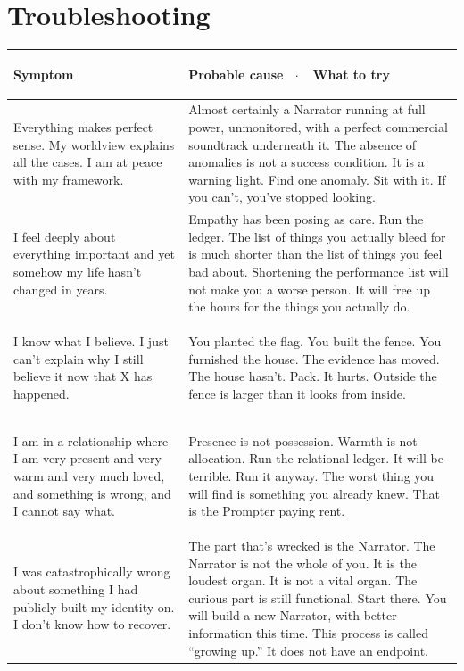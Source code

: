 \documentclass[11pt, letterpaper]{article}
\begin{document}
\section{Troubleshooting}

\begin{center}
\small
\begin{tabularx}{\textwidth}{@{} >{\bfseries\raggedright\arraybackslash}p{5cm} X @{}}
\toprule
\textbf{Symptom} & \textbf{Probable cause \ $\cdot$\ \ What to try} \\
\midrule
Everything makes perfect sense. My worldview explains all the cases. I am at peace with my framework. &
Almost certainly a Narrator running at full power, unmonitored, with a perfect commercial soundtrack underneath it. The absence of anomalies is not a success condition. It is a warning light. Find one anomaly. Sit with it. If you can't, you've stopped looking. \\[8pt]

I feel deeply about everything important and yet somehow my life hasn't changed in years. &
Empathy has been posing as care. Run the ledger. The list of things you actually bleed for is much shorter than the list of things you feel bad about. Shortening the performance list will not make you a worse person. It will free up the hours for the things you actually do. \\[8pt]

I know what I believe. I just can't explain why I still believe it now that X has happened. &
You planted the flag. You built the fence. You furnished the house. The evidence has moved. The house hasn't. Pack. It hurts. Outside the fence is larger than it looks from inside. \\[8pt]

I am in a relationship where I am very present and very warm and very much loved, and something is wrong, and I cannot say what. &
Presence is not possession. Warmth is not allocation. Run the relational ledger. It will be terrible. Run it anyway. The worst thing you will find is something you already knew. That is the Prompter paying rent. \\[8pt]

I was catastrophically wrong about something I had publicly built my identity on. I don't know how to recover. &
The part that's wrecked is the Narrator. The Narrator is not the whole of you. It is the loudest organ. It is not a vital organ. The curious part is still functional. Start there. You will build a new Narrator, with better information this time. This process is called ``growing up.'' It does not have an endpoint. \\[8pt]


\end{tabularx}
\end{center}
\end{document}
